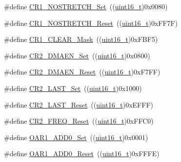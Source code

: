 \begin{DoxyCompactItemize}
\item 
\#define \hyperlink{group___i2_c___private___defines_gac4abee43c3523527780f200adf465bc0}{C\+R1\+\_\+\+N\+O\+S\+T\+R\+E\+T\+C\+H\+\_\+\+Set}~((\hyperlink{_p_e___types_8h_a1f1825b69244eb3ad2c7165ddc99c956}{uint16\+\_\+t})0x0080)
\item 
\#define \hyperlink{group___i2_c___private___defines_ga9a1609fd4bbcc38fc6423836730c8fa0}{C\+R1\+\_\+\+N\+O\+S\+T\+R\+E\+T\+C\+H\+\_\+\+Reset}~((\hyperlink{_p_e___types_8h_a1f1825b69244eb3ad2c7165ddc99c956}{uint16\+\_\+t})0x\+F\+F7\+F)
\item 
\#define \hyperlink{group___i2_c___private___defines_ga67f7dd35ea3d1296677e5fc50b88fa90}{C\+R1\+\_\+\+C\+L\+E\+A\+R\+\_\+\+Mask}~((\hyperlink{_p_e___types_8h_a1f1825b69244eb3ad2c7165ddc99c956}{uint16\+\_\+t})0x\+F\+B\+F5)
\item 
\#define \hyperlink{group___i2_c___private___defines_gafe82da50fa03bd5ecb36340da64c87ca}{C\+R2\+\_\+\+D\+M\+A\+E\+N\+\_\+\+Set}~((\hyperlink{_p_e___types_8h_a1f1825b69244eb3ad2c7165ddc99c956}{uint16\+\_\+t})0x0800)
\item 
\#define \hyperlink{group___i2_c___private___defines_gabe742f89a768e29b9a2d86f7782991a6}{C\+R2\+\_\+\+D\+M\+A\+E\+N\+\_\+\+Reset}~((\hyperlink{_p_e___types_8h_a1f1825b69244eb3ad2c7165ddc99c956}{uint16\+\_\+t})0x\+F7\+F\+F)
\item 
\#define \hyperlink{group___i2_c___private___defines_ga3604dd2f23b0f15a088ef6fe9731485a}{C\+R2\+\_\+\+L\+A\+S\+T\+\_\+\+Set}~((\hyperlink{_p_e___types_8h_a1f1825b69244eb3ad2c7165ddc99c956}{uint16\+\_\+t})0x1000)
\item 
\#define \hyperlink{group___i2_c___private___defines_ga904e044226182269485936bad8314f84}{C\+R2\+\_\+\+L\+A\+S\+T\+\_\+\+Reset}~((\hyperlink{_p_e___types_8h_a1f1825b69244eb3ad2c7165ddc99c956}{uint16\+\_\+t})0x\+E\+F\+F\+F)
\item 
\#define \hyperlink{group___i2_c___private___defines_ga2bcf74bd8fc3aaa931faf750d1afe405}{C\+R2\+\_\+\+F\+R\+E\+Q\+\_\+\+Reset}~((\hyperlink{_p_e___types_8h_a1f1825b69244eb3ad2c7165ddc99c956}{uint16\+\_\+t})0x\+F\+F\+C0)
\item 
\#define \hyperlink{group___i2_c___private___defines_gaeb56bf422fd13e68c82783df63f425ab}{O\+A\+R1\+\_\+\+A\+D\+D0\+\_\+\+Set}~((\hyperlink{_p_e___types_8h_a1f1825b69244eb3ad2c7165ddc99c956}{uint16\+\_\+t})0x0001)
\item 
\#define \hyperlink{group___i2_c___private___defines_gac5c2ac4577b70e1d7618b7fa1d715e3a}{O\+A\+R1\+\_\+\+A\+D\+D0\+\_\+\+Reset}~((\hyperlink{_p_e___types_8h_a1f1825b69244eb3ad2c7165ddc99c956}{uint16\+\_\+t})0x\+F\+F\+F\+E)

\end{DoxyCompactItemize}
